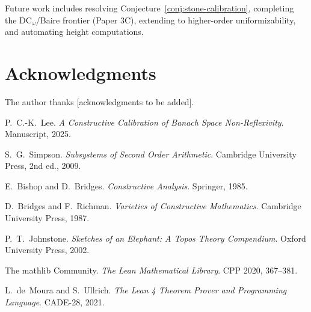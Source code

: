 \documentclass[11pt]{article}
\begin{document}
\noindent Future work includes resolving Conjecture~\ref{conj:stone-calibration}, completing the DC$_\omega$/Baire frontier (Paper 3C), extending to higher-order uniformizability, and automating height computations.

\section*{Acknowledgments}

The author thanks [acknowledgments to be added].

\begin{thebibliography}{10}

P.~C.-K.~Lee.
\emph{A Constructive Calibration of Banach Space Non-Reflexivity}.
Manuscript, 2025.

S.~G.~Simpson.
\emph{Subsystems of Second Order Arithmetic}.
Cambridge University Press, 2nd ed., 2009.

E.~Bishop and D.~Bridges.
\emph{Constructive Analysis}.
Springer, 1985.

D.~Bridges and F.~Richman.
\emph{Varieties of Constructive Mathematics}.
Cambridge University Press, 1987.

P.~T.~Johnstone.
\emph{Sketches of an Elephant: A Topos Theory Compendium}.
Oxford University Press, 2002.

The mathlib Community.
\emph{The Lean Mathematical Library}.
CPP 2020, 367--381.

L.~de~Moura and S.~Ullrich.
\emph{The Lean 4 Theorem Prover and Programming Language}.
CADE-28, 2021.

\end{thebibliography}
\end{document}
